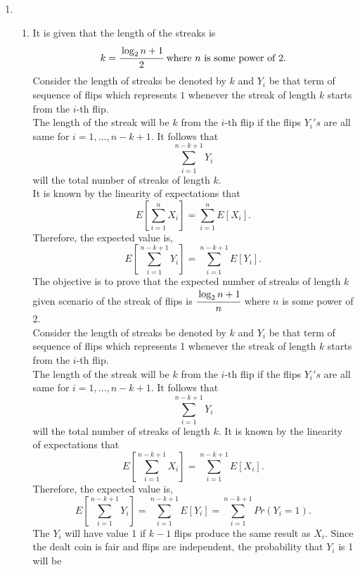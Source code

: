\documentclass{article}
\begin{document}
\begin{enumerate}
\newpage
\item
    \begin{enumerate}
        \item
            It is given that the length of the streaks is
            \[ 
                k = \cfrac{\log_2 n + 1}{2} \text{ where } n \text{ is some power of 2.} 
            \]
            Consider the length of streaks be denoted by \( k \) and \( Y_i \) be that term of sequence of flips which 
            represents \( 1 \) whenever the streak of length \( k \) starts from the \( i \)-th flip.\\    
            The length of the streak will be \( k \) from the \( i \)-th flip if the flips \( Y_i's \) are all same for \( i = 1,\ldots,n-k+1 \).
            It follows that
            \[ 
                \sum_{i=1}^{n-k+1} Y_i
            \]
            will the total number of streaks of length \( k \).\\
            It is known by the linearity of expectations that
            \[
                E\left[\sum_{i=1}^n X_i\right] = \sum_{i=1}^n E[X_i].
            \]
            Therefore, the expected value is,
            \[
                E\left[\sum_{i=1}^{n-k+1} Y_i\right] = \sum_{i=1}^{n-k+1} E[Y_i].
            \]
            The objective is to prove that the expected number of streaks of length \( k \) given scenario of the streak of flips is \( \cfrac{\log_2 n + 1}{n} \) where \( n \) is some power of 2.\\
            Consider the length of streaks be denoted by \( k \) and \( Y_i \) be that term of sequence of flips which represents 1 whenever the streak of length \( k \) starts from the \( i \)-th flip.\\
            The length of the streak will be \( k \) from the \( i \)-th flip if the flips \( Y_i's \) are all same for \( i = 1,...,n-k+1 \). It follows that
            \[
                \sum_{i=1}^{n-k+1} Y_i
            \]
            will the total number of streaks of length \( k \).
            It is known by the linearity of expectations that
            \[
                E\left[\sum_{i=1}^{n-k+1} X_i\right] = \sum_{i=1}^{n-k+1} E[X_i].
            \]
            Therefore, the expected value is,
            \[
                E\left[\sum_{i=1}^{n-k+1} Y_i\right] = \sum_{i=1}^{n-k+1} E[Y_i] = \sum_{i=1}^{n-k+1} Pr(Y_i = 1).
            \]
            The \( Y_i \) will have value 1 if \( k-1 \) flips produce the same result as \( X_i \). Since the dealt coin is fair and flips are independent, the probability that \( Y_i \) is 1 will be

\end{enumerate}
\end{enumerate}
\end{document}
